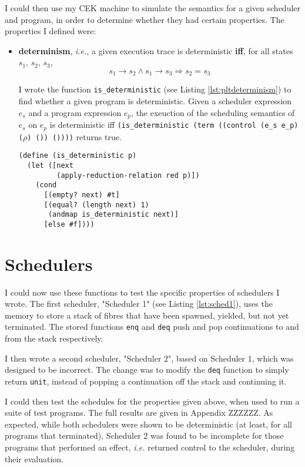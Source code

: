 \documentclass[12pt,a4paper,twoside,openright]{report}
\begin{document}
I could then use my CEK machine to simulate the semantics for a given scheduler and program, in order to determine whether they had certain properties. The properties I defined were:

\begin{itemize}
\item \textbf{determinism}, \textit{i.e.}, a given execution trace is deterministic \textbf{iff}, for all states $s_1$, $s_2$, $s_3$, $$s_1 \longrightarrow s_2 \wedge s_1 \longrightarrow s_3 \Rightarrow s_2 = s_3$$

I wrote the function \texttt{is\_deterministic} (see Listing \ref{lst:pltdeterminism}) to find whether a given program is deterministic. Given a scheduler expression $e_s$ and a program expression $e_p$, the exeuction of the scheduling semantics of $e_s$ on $e_p$ is deterministic iff \texttt{(is\_deterministic (term ((control (e\_s e\_p) ($\rho$) ()) ())))} returns true.

\begin{minipage}{\linewidth} \begin{lstlisting}[caption=A function that determines whether a scheduler and program in \texttt{Alg} are deterministic,label={lst:pltdeterminism}]
(define (is_deterministic p)
  (let ([next
         (apply-reduction-relation red p)])
    (cond
      [(empty? next) #t]
      [(equal? (length next) 1)
       (andmap is_deterministic next)]
      [else #f])))
\end{lstlisting} \end{minipage}

\end{itemize}

\section{Schedulers}
I could now use these functions to test the specific properties of schedulers I wrote. The first scheduler, "Scheduler 1" (see Listing \ref{lst:sched1}), uses the memory to store a stack of fibres that have been spawned, yielded, but not yet terminated. The stored functions \texttt{enq} and \texttt{deq} push and pop continuations to and from the stack respectively.

I then wrote a second scheduler, "Scheduler 2", based on Scheduler 1, which was designed to be incorrect. The change was to modify the \texttt{deq} function to simply return \texttt{unit}, instead of popping a continuation off the stack and continuing it.

I could then test the schedules for the properties given above, when used to run a suite of test programs. The full results are given in Appendix ZZZZZZ. As expected, while both schedulers were shown to be deterministic (at least, for all programs that terminated), Scheduler 2 was found to be incomplete for those programs that performed an effect, \textit{i.e.} returned control to the scheduler, during their evaluation.
\end{document}
